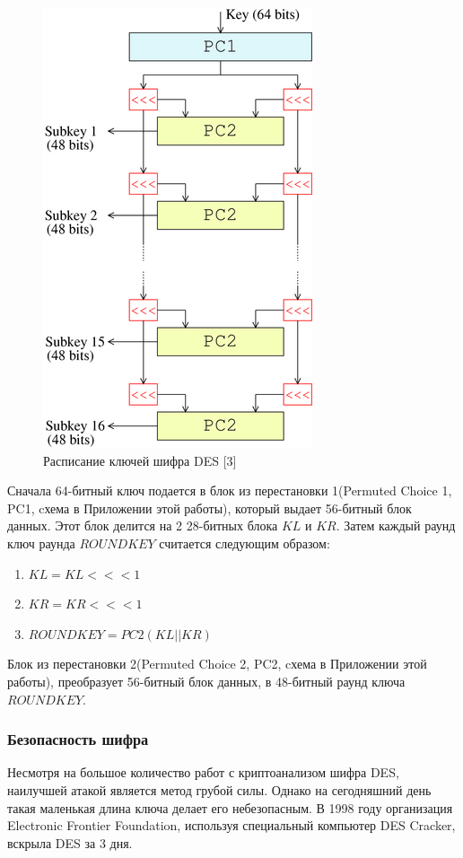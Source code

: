 \documentclass[colorthm]{./civarticle}
\begin{document}
\begin{figure}
    \centering
    \includegraphics[width=0.5\linewidth]{DES-key-schedule.png}
    \caption{Расписание ключей шифра DES [3]}
    \label{fig:enter-label}
\end{figure}

Сначала 64-битный ключ подается в блок  из перестановки 1\textquotedbl (Permuted Choice 1, PC1, cхема в Приложении этой работы), который выдает 56-битный блок данных. Этот блок делится на 2 28-битных блока $KL$ и $KR$. Затем каждый раунд ключ раунда $ROUNDKEY$ считается следующим образом:

\begin{enumerate}
    \item $KL = KL <<< 1$
    \item $KR = KR <<< 1$
    \item $ROUNDKEY = PC2(KL||KR)$
\end{enumerate}

Блок  из перестановки 2\textquotedbl (Permuted Choice 2, PC2, cхема в Приложении этой работы), преобразует 56-битный блок данных, в 48-битный раунд ключа $ROUNDKEY$.

\subsubsection{Безопасность шифра}

Несмотря на большое количество работ с криптоанализом шифра DES, наилучшей атакой является метод грубой силы. Однако на сегодняшний день такая маленькая длина ключа делает его небезопасным. В 1998 году организация Electronic Frontier Foundation, используя специальный компьютер DES Cracker, вскрыла DES за 3 дня.
\end{document}
